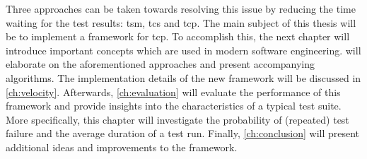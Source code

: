 \noindent Three approaches can be taken towards resolving this issue by reducing the time waiting for the test results: \acrfull{tsm}, \acrfull{tcs} and \acrfull{tcp}. The main subject of this thesis will be to implement a framework for \acrshort{tcp}. To accomplish this, the next chapter will introduce important concepts which are used in modern software engineering.  will elaborate on the aforementioned approaches and present accompanying algorithms. The implementation details of the new framework will be discussed in \cref{ch:velocity}. Afterwards, \cref{ch:evaluation} will evaluate the performance of this framework and provide insights into the characteristics of a typical test suite. More specifically, this chapter will investigate the probability of (repeated) test failure and the average duration of a test run. Finally, \cref{ch:conclusion} will present additional ideas and improvements to the framework.